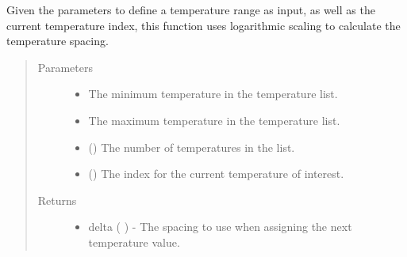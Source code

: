 \documentclass[letterpaper,12pt,english,openany,oneside]{sphinxmanual}
\begin{document}
\begin{fulllineitems}
\label{\detokenize{thermo:parameters.reweight.calc_temperature_spacing}}
Given the parameters to define a temperature range as input, as well as the current temperature index, this function uses logarithmic scaling to calculate the temperature spacing.
\begin{quote}\begin{description}
\item[{Parameters}] \leavevmode\begin{itemize}
\item {} 
 \textendash{} The minimum temperature in the temperature list.

\item {} 
 \textendash{} The maximum temperature in the temperature list.

\item {} 
 () \textendash{} The number of temperatures in the list.

\item {} 
 () \textendash{} The index for the current temperature of interest.

\end{itemize}

\item[{Returns}] \leavevmode
\begin{itemize}
\item {} 
delta (  ) - The spacing to use when assigning the next temperature value.

\end{itemize}


\end{description}\end{quote}

\end{fulllineitems}
\end{document}
